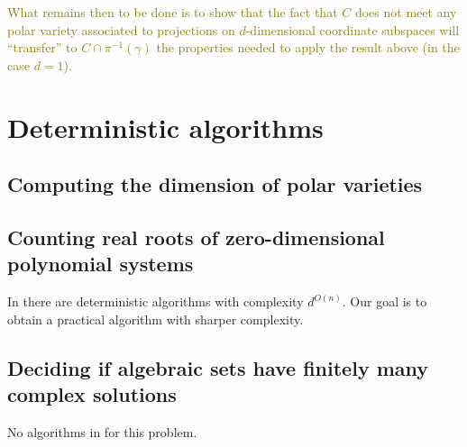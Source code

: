 \documentclass[10pt]{article}
\theoremstyle{definition}
\def\ms#1{\textcolor{olive}{#1}}
\begin{document}
\ms{What remains then to be done is to show that the fact that $C$ does not meet
any polar variety associated to projections on $d$-dimensional coordinate
subspaces will ``transfer'' to $C\cap \pi^{-1}(\gamma)$ the properties needed to
apply the result above (in the case $d = 1$).}
%













\section{Deterministic algorithms}



\subsection{Computing the dimension of polar varieties}




\subsection{Counting real roots of zero-dimensional polynomial systems}
In \cite{BasuPollackRoy2006} there are deterministic algorithms with complexity $d^{O(n)}$. Our goal is to obtain a practical algorithm with sharper complexity. 



\subsection{Deciding if algebraic sets have finitely many complex solutions}
No algorithms in \cite{BasuPollackRoy2006} for this problem. 



\newpage 


\newpage 
\end{document}
